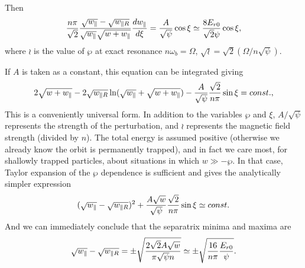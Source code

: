 Then
\begin{equation}
  \label{eq:shalnorm}
  {n\pi\over \sqrt{2}}
  {\sqrt{\wp}-\sqrt{\wr }\over
    \sqrt{\wp}\sqrt{w+\wp}} {d\wp\over d\xi} 
  ={A\over\sqrt{\psi}}\cos\xi \simeq {8E_{r0}\over\sqrt{2}\psi }\cos\xi ,
\end{equation}
where $\wr $ is the value of $\wp$ at exact
resonance $n\omega_b=\Omega$,
$\sqrt{\wr }=\sqrt{2}(\Omega/n\sqrt{\psi})$.

If $A$ is taken as a constant, this equation can
be integrated giving 
\begin{equation}
  \label{eq:constA}
  2\sqrt{w+\wp}
  -2\sqrt{\wr }\ln(\sqrt{\wp}+\sqrt{w+\wp})
  -{A\over\sqrt{\psi}}{\sqrt{2}\over n\pi}\sin\xi = const.,
\end{equation}
This is a conveniently universal form. In addition to the variables
$\wp$ and $\xi$, $A/\sqrt{\psi}$ represents the strength of
the perturbation, and $\wr $ represents the magnetic field
strength (divided by $n$). The total energy is assumed positive
(otherwise we already know the orbit is permanently trapped), and in
fact we care most, for shallowly trapped particles, about situations
in which $w\gg -\wp$.  In that case, Taylor expansion of the
$\wp$ dependence is sufficient and gives the analytically
simpler expression
\begin{equation}
  \label{eq:taylorw}
  (\sqrt{\wp}-\sqrt{\wr })^2 + 
{A\sqrt{w}\over\sqrt{\psi}}{\sqrt{2}\over n\pi}\sin\xi \simeq const.
\end{equation}
And we can immediately conclude that the separatrix minima and maxima are
\begin{equation}
\sqrt{\wp}-\sqrt{\wr }=\pm
\sqrt{2\sqrt{2}A\sqrt{w}\over \pi\sqrt{\psi}n}
\simeq\pm \sqrt{{16 \over  n\pi}{E_{r0}\over \psi}}.
\end{equation}

